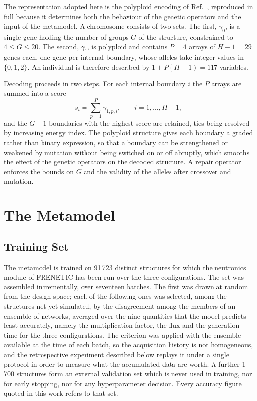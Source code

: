 \documentclass{style/nseJournal}
\begin{document}
The representation adopted here is the polyploid encoding of
Ref.~\cite{prevMulti}, reproduced in full because it determines both the
behaviour of the genetic operators and the input of the metamodel. A chromosome
consists of two sets. The first, $\gamma_0$, is a single gene holding the number
of groups $G$ of the structure, constrained to $4\le G\le20$. The second,
$\gamma_1$, is polyploid and contains $P=4$ arrays of $H-1=29$ genes each, one
gene per internal boundary, whose alleles take integer values in $\{0,1,2\}$. An
individual is therefore described by $1+P(H-1)=117$ variables.

Decoding proceeds in two steps. For each internal boundary $i$ the $P$ arrays
are summed into a score
%
\begin{equation}
  s_i = \sum_{p=1}^{P} \gamma_{1,p,i}, \qquad i = 1,\dots,H-1,
  \label{eqn:score}
\end{equation}
%
and the $G-1$ boundaries with the highest score are retained, ties being
resolved by increasing energy index. The polyploid structure gives each boundary
a graded rather than binary expression, so that a boundary can be strengthened
or weakened by mutation without being switched on or off abruptly, which
smooths the effect of the genetic operators on the decoded structure. A repair
operator enforces the bounds on $G$ and the validity of the alleles after
crossover and mutation.


\section{The Metamodel}

\subsection{Training Set}

The metamodel is trained on 91\,723 distinct structures for which the
neutronics module of FRENETIC has been run over the three configurations. The
set was assembled incrementally, over seventeen batches. The first was drawn at
random from the design space; each of the following ones was selected, among the
structures not yet simulated, by the disagreement among the members of an
ensemble of networks, averaged over the nine quantities that the model predicts
least accurately, namely the multiplication factor, the flux and the generation
time for the three configurations. The criterion was applied with the ensemble
available at the time of each batch, so the acquisition history is not
homogeneous, and the retrospective experiment described below replays it under a
single protocol in order to measure what the accumulated data are worth. A
further 1\,700 structures form an external validation set which is never used in
training, nor for early stopping, nor for any hyperparameter decision. Every
accuracy figure quoted in this work refers to that set.
\end{document}
